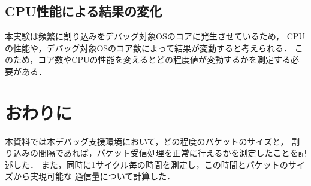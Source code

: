 \documentclass[12pt]{jsarticle}
\begin{document}
\subsection{CPU性能による結果の変化}
本実験は頻繁に割り込みをデバッグ対象OSのコアに発生させているため，
CPUの性能や，デバッグ対象OSのコア数によって結果が変動すると考えられる．
このため，コア数やCPUの性能を変えるとどの程度値が変動するかを測定する必要がある．

\section{おわりに}
本資料では本デバッグ支援環境において，どの程度のパケットのサイズと，
割り込みの間隔であれば，パケット受信処理を正常に行えるかを測定したことを記述した．
また，同時に1サイクル毎の時間を測定し，この時間とパケットのサイズから実現可能な
通信量について計算した．
\end{document}
